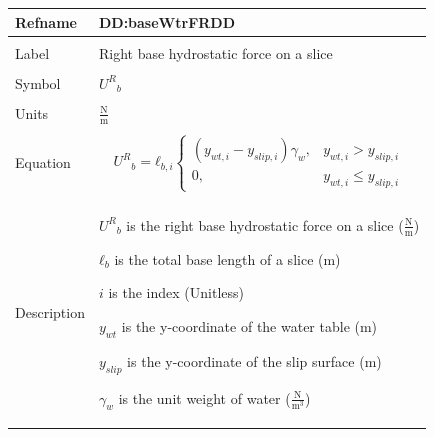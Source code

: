 \documentclass[12pt]{article}
\begin{document}
\noindent \begin{minipage}{\textwidth}
\begin{tabular}{p{} p{}}
\toprule \textbf{Refname} & \textbf{DD:baseWtrFRDD}
\label{DD:baseWtrFRDD}
\\ \midrule \\
Label & Right base hydrostatic force on a slice
        \\ \midrule \\
        Symbol & ${{U^{R}}_{b}}$
                 \\ \midrule \\
                 Units & $\frac{\text{N}}{\text{m}}$
                         \\ \midrule \\
                         Equation & \begin{displaymath}
                                    {{U^{R}}_{b}}={ℓ_{b,i}} \begin{cases}
\left({y_{wt,i}}-{y_{slip,i}}\right) {γ_{w}}, & {y_{wt,i}}>{y_{slip,i}}\\
0, & {y_{wt,i}}\leq{}{y_{slip,i}}
\end{cases}
                                    \end{displaymath}
                                    \\ \midrule \\
                                    Description & \begin{symbDescription}
                                                  \item{${{U^{R}}_{b}}$ is the right base hydrostatic force on a slice ($\frac{\text{N}}{\text{m}}$)}
                                                  \item{${ℓ_{b}}$ is the total base length of a slice (m)}
                                                  \item{$i$ is the index (Unitless)}
                                                  \item{${y_{wt}}$ is the y-coordinate of the water table (m)}
                                                  \item{${y_{slip}}$ is the y-coordinate of the slip surface (m)}
                                                  \item{${γ_{w}}$ is the unit weight of water ($\frac{\text{N}}{\text{m}^{3}}$)}
                                                  \end{symbDescription}

\end{tabular}
\end{minipage}
\end{document}
